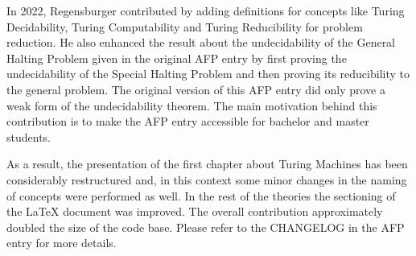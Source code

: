 \documentclass{report}
\begin{document}
In 2022, Regensburger contributed by adding definitions for
concepts like Turing Decidability, Turing Computability and Turing Reducibility
for problem reduction. He also enhanced the result about the
undecidability of the General Halting Problem given in the original AFP entry
by first proving the undecidability of the Special Halting Problem and then
proving its reducibility to the general problem. The original version of this
AFP entry did only prove a weak form of the undecidability theorem.
The main motivation behind this contribution is to make the AFP entry
accessible for bachelor and master students.

As a result, the presentation of the first chapter about Turing
Machines has been considerably restructured and, in this context some minor
changes in the naming of concepts were performed as well. In the rest of the theories
the sectioning of the \LaTeX{} document was improved.
The overall contribution approximately doubled the size of the code base.
Please refer to the CHANGELOG in the AFP entry for more details.





\end{document}
